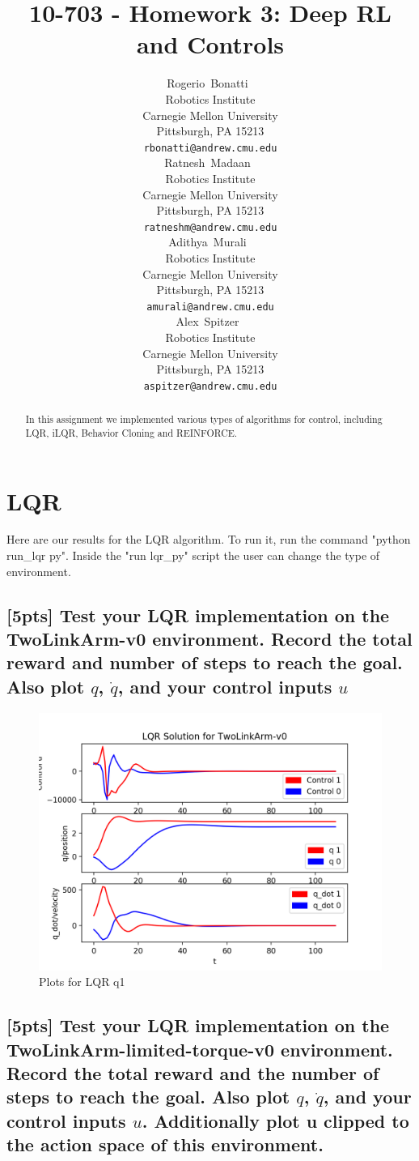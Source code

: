 \documentclass{article}
\title{10-703 - Homework 3: Deep RL and Controls}
\author{
  Rogerio~Bonatti\ \\
  Robotics Institute\\
  Carnegie Mellon University\\
  Pittsburgh, PA 15213 \\
  \texttt{rbonatti@andrew.cmu.edu} \\
  \And
  Ratnesh~Madaan\ \\
  Robotics Institute\\
  Carnegie Mellon University\\
  Pittsburgh, PA 15213 \\
  \texttt{ratneshm@andrew.cmu.edu} \\
  \And
  Adithya~Murali\ \\
  Robotics Institute\\
  Carnegie Mellon University\\
  Pittsburgh, PA 15213 \\
  \texttt{amurali@andrew.cmu.edu} \\
  \And
  Alex~Spitzer\ \\
  Robotics Institute\\
  Carnegie Mellon University\\
  Pittsburgh, PA 15213 \\
  \texttt{aspitzer@andrew.cmu.edu} \\
}
\begin{document}

\maketitle

\begin{abstract}
  In this assignment we implemented various types of algorithms for control, including LQR, iLQR, Behavior Cloning and REINFORCE. 
\end{abstract}

\section{LQR}
Here are our results for the LQR algorithm. To run it, run the command "python run\_lqr py". Inside the "run lqr\_py" script the user can change the type of environment.

\subsection{[5pts] Test your LQR implementation on the TwoLinkArm-v0 environment. Record the total reward and number of steps to reach the goal. Also plot $q$, $\dot{q}$, and your control inputs $u$}

\begin{figure}[H] \label{fig:lqr_qn1}
  \centering
  \includegraphics[width=1.2\textwidth]{images/lqr_qn1}
  \caption{Plots for LQR q1}
\end{figure}

\subsection{[5pts] Test your LQR implementation on the TwoLinkArm-limited-torque-v0 environment. Record the total reward and the number of steps to reach the goal. Also plot $q$, $\dot{q}$, and your control inputs $u$. Additionally plot u clipped to the action space of this environment.}
\end{document}
